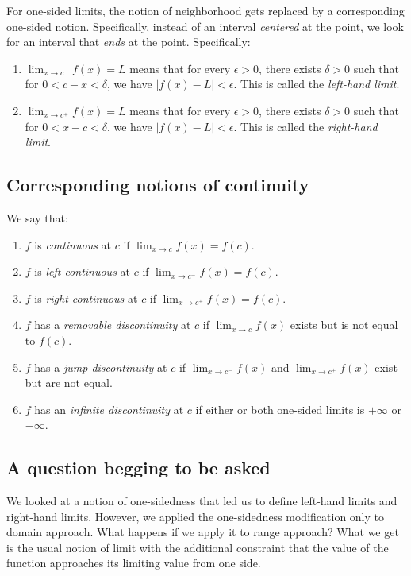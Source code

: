 \documentclass[10pt]{amsart}
\begin{document}
For one-sided limits, the notion of neighborhood gets replaced by a
corresponding one-sided notion. Specifically, instead of an interval
{\em centered} at the point, we look for an interval that {\em ends}
at the point. Specifically:

\begin{enumerate}
\item $\lim_{x \to c^-} f(x) = L$ means that for every $\epsilon > 0$,
  there exists $\delta > 0$ such that for $0 < c - x < \delta$, we
  have $|f(x) - L| < \epsilon$. This is called the {\em left-hand
  limit}.
\item $\lim_{x \to c^+} f(x) = L$ means that for every $\epsilon > 0$,
  there exists $\delta > 0$ such that for $0 < x - c < \delta$, we
  have $|f(x) - L| < \epsilon$. This is called the {\em right-hand
  limit}.
\end{enumerate}

\subsection{Corresponding notions of continuity}

We say that:

\begin{enumerate}
\item $f$ is {\em continuous} at $c$ if $\lim_{x \to c} f(x) = f(c)$.
\item $f$ is {\em left-continuous} at $c$ if $\lim_{x \to c^-} f(x) =
  f(c)$.
\item $f$ is {\em right-continuous} at $c$ if $\lim_{x \to c^+} f(x) =
  f(c)$.
\item $f$ has a {\em removable discontinuity} at $c$ if $\lim_{x \to
  c} f(x)$ exists but is not equal to $f(c)$.
\item $f$ has a {\em jump discontinuity} at $c$ if $\lim_{x \to c^-}
  f(x)$ and $\lim_{x \to c^+} f(x)$ exist but are not equal.
\item $f$ has an {\em infinite discontinuity} at $c$ if either or both
  one-sided limits is $+\infty$ or $-\infty$.
\end{enumerate}

\subsection{A question begging to be asked}

We looked at a notion of one-sidedness that led us to define
left-hand limits and right-hand limits. However, we applied the
one-sidedness modification only to domain approach. What happens if we
apply it to range approach? What we get is the usual notion of limit
with the additional constraint that the value of the function
approaches its limiting value from one side.
\end{document}

